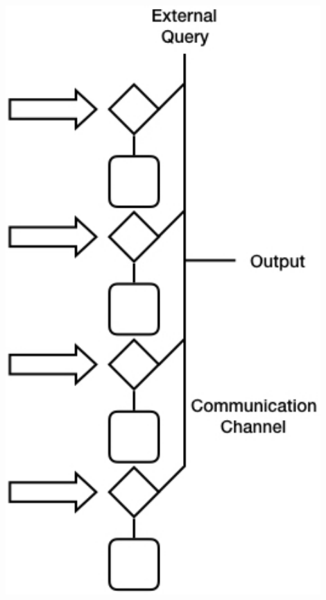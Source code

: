 \documentclass{beamer}
\begin{document}
\begin{frame}
\begin{columns}
\begin{column}{0.35\textwidth}
\begin{center}
	\includegraphics[width=0.9\textwidth]{dist_stream_model}
\end{center}
\end{column}

\end{columns}
\end{frame}

\end{document}
